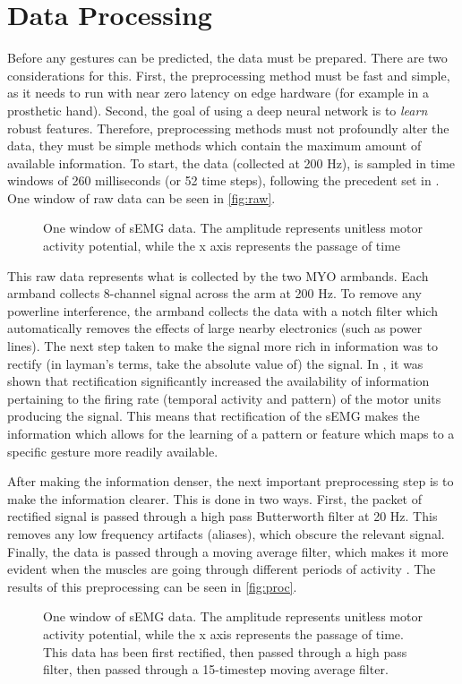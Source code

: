 \section{Data Processing}

Before any gestures can be predicted, the data must be prepared. There are two considerations for this. First, the preprocessing method must be fast and simple, as it needs to run with near zero latency on edge hardware (for example in a prosthetic hand). Second, the goal of using a deep neural network is to \emph{learn} robust features. Therefore, preprocessing methods must not profoundly alter the data, they must be simple methods which contain the maximum amount of available information. To start, the data (collected at 200 Hz), is sampled in time windows of 260 milliseconds (or 52 time steps), following the precedent set in \cite{primary}. One window of raw data can be seen in \autoref{fig:raw}.

\begin{figure}[h]
\caption{One window of sEMG data. The amplitude represents unitless motor activity potential, while the x axis represents the passage of time}
\label{fig:raw}
    \centering
    \def\svgwidth{0.7\columnwidth}
    
\end{figure}

This raw data represents what is collected by the two MYO armbands. Each armband collects 8-channel signal across the arm at 200 Hz. To remove any powerline interference, the armband collects the data with a notch filter which automatically removes the effects of large nearby electronics (such as power lines). The next step taken to make the signal more rich in information was to rectify (in layman's terms, take the absolute value of) the signal. In \cite{rectif}, it was shown that rectification significantly increased the availability of information pertaining to the  firing rate (temporal activity and pattern) of the motor units producing the signal. This means that rectification of the sEMG makes the information which allows for the learning of a pattern or feature which maps to a specific gesture more readily available.
\par After making the information denser, the next important preprocessing step is to make the information clearer. This is done in two ways. First, the packet of rectified signal is passed through a high pass Butterworth filter at 20 Hz. This removes any low frequency artifacts (aliases), which obscure the relevant signal. Finally, the data is passed through a moving average filter, which makes it more evident when the muscles are going through different periods of activity \cite{humancom}. The results of this preprocessing can be seen in \autoref{fig:proc}.
\begin{figure}[H]
\caption{One window of sEMG data. The amplitude represents unitless motor activity potential, while the x axis represents the passage of time. This data has been first rectified, then passed through a high pass filter, then passed through a 15-timestep moving average filter.}
\label{fig:proc}
    \centering
    \def\svgwidth{0.7\columnwidth}
    
\end{figure}

